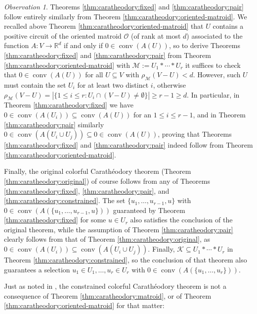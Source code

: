 \documentclass[a4paper,11pt,reqno, english]{amsart}
\theoremstyle{definition}
\theoremstyle{remark}
\newtheorem{observation}[theorem]{Observation}
\newcommand\R{\mathbb R}
\DeclareMathOperator{\conv}{\mathrm{conv}}
\begin{document}
\begin{observation}
    Theorems \ref{thm:caratheodory:fixed} and \ref{thm:caratheodory:pair} follow entirely similarly from Theorem \ref{thm:caratheodory:oriented-matroid}. We recalled above Theorem \ref{thm:caratheodory:oriented-matroid} that $U$ contains a positive circuit of the oriented matroid $\mathscr{O}$ (of rank at most $d$) associated to the function $A\colon V\to\R^d$ if and only if $0\in\conv(A(U))$, so to derive Theorems \ref{thm:caratheodory:fixed} and \ref{thm:caratheodory:pair} from Theorem \ref{thm:caratheodory:oriented-matroid} with $\mathscr{M}:=U_1*\cdots*U_r$ it suffices to check that $0\in\conv(A(U))$ for all $U\subseteq V$ with $\rho_\mathscr{M}(V-U)<d$. However, such $U$ must contain the set $U_i$ for at least two distinct $i$, otherwise $\rho_\mathscr{M}(V-U)=|\{1\leq i\leq r:U_i\cap (V-U)\neq\emptyset\}|\geq r-1\geq d$. In particular, in Theorem \ref{thm:caratheodory:fixed} we have $0\in\conv(A(U_i))\subseteq\conv(A(U))$ for an $1\leq i\leq r-1$, and in Theorem \ref{thm:caratheodory:pair} similarly $0\in\conv(A(U_i\cup U_j))\subseteq 0\in\conv(A(U))$, proving that Theorems \ref{thm:caratheodory:fixed} and \ref{thm:caratheodory:pair} indeed follow from Theorem \ref{thm:caratheodory:oriented-matroid}.

    Finally, the original colorful Carath\'eodory theorem (Theorem \ref{thm:caratheodory:original}) of course follows from any of Theorems \ref{thm:caratheodory:fixed}, \ref{thm:caratheodory:pair}, and \ref{thm:caratheodory:constrained}. The set $\{u_1,\ldots,u_{r-1},u\}$ with $0\in\conv(A(\{u_1,\ldots,u_{r-1},u\}))$ guaranteed by Theorem \ref{thm:caratheodory:fixed} for some $u\in U_r$ also satisfies the conclusion of the original theorem, while the assumption of Theorem \ref{thm:caratheodory:pair} clearly follows from that of Theorem \ref{thm:caratheodory:original}, as $0\in\conv(A(U_i))\subseteq\conv(A(U_i\cup U_j))$. Finally, $\mathscr{K}\subseteq U_1*\cdots*U_r$ in Theorem \ref{thm:caratheodory:constrained}, so the conclusion of that theorem also guarantees a selection $u_1\in U_1,\ldots,u_r\in U_r$ with $0\in\conv(A(\{u_1,\ldots,u_r\}))$.
\end{observation}
Just as noted in \cite{Blagojevic2025}, the constrained colorful Carath\'eodory theorem is not a consequence of Theorem \ref{thm:caratheodory:matroid}, or of Theorem \ref{thm:caratheodory:oriented-matroid} for that matter:
\end{document}
